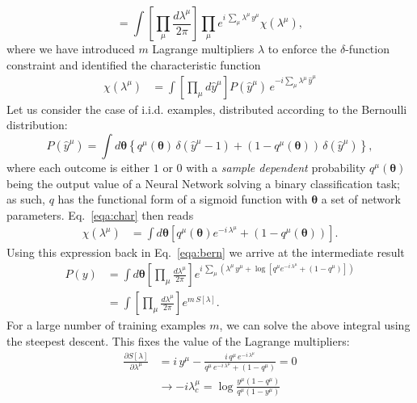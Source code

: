 \documentclass{article}
\begin{document}
 \begin{equation}
 =  \int  \left[ \prod_{\mu}  \frac{d\lambda^{\mu}}{2\pi} \right] \prod_{\mu}  e^{i \, \sum_{\mu} \lambda^{\mu} \, y^{\mu} } \chi(\lambda^{\mu}),
\end{equation}
%
where we have introduced $m$ Lagrange multipliers $\lambda$ to enforce the $\delta$-function constraint and identified  the characteristic function
%
\begin{align} \label{eqa:char}
\chi(\lambda^{\mu}) &=  \int  \left[ \prod_{\mu} d\hat{y}^{\mu} \right]  P(\hat{y}^{\mu} )  \, e^{-i \sum_{\mu} \lambda^{\mu} \, \hat{y}^{\mu}}
\end{align}
%
Let us consider the case of i.i.d. examples, distributed according to the Bernoulli distribution:
%
\begin{equation} \label{eqa:bern}
P(\hat{y}^{\mu} ) = \int d\boldsymbol{\theta} \left\{ q^{\mu}(\boldsymbol{\theta}) \, \delta(\hat{y}^{\mu}-1 ) + (1-q^{\mu}(\boldsymbol{\theta}) ) \, \delta(\hat{y}^{\mu}) \right\},
\end{equation}
%
where each outcome is either $1$ or $0$ with a {\it sample dependent} probability $q^{\mu}(\boldsymbol{\theta})$ being the output value of a Neural Network solving a binary classification task; as such, $q$ has the functional form of a sigmoid function with $\boldsymbol{\theta}$ a set of network parameters. Eq.~\eqref{eqa:char} then reads
\begin{align} \label{eqa:char}
 \chi(\lambda^{\mu}) &=  \int  d\boldsymbol{\theta} \left[ q^{\mu}(\boldsymbol{\theta} ) e^{-i \, \lambda^{\mu} } +(1-q^{\mu}(\boldsymbol{\theta} )) \right].
 \end{align}
%
Using this expression back in Eq.~\eqref{eqa:bern} we arrive at the intermediate result
%
 \begin{align} \label{eqa:cl2} \nonumber
 P(y) &= \int d\boldsymbol{\theta} \left[ \prod_{\mu}  \frac{d\lambda^{\mu}}{2\pi} \right] e^{i \, \sum_{\mu} ( \lambda^{\mu} \, y^{\mu} + \log \left[ q^{\mu} e^{-i \, \lambda^{\mu} } +(1-q^{\mu}) \right] )}  \\
 &=  \int  \left[ \prod_{\mu}  \frac{d\lambda^{\mu}}{2\pi} \right] e^{m \, S[\lambda]}.
 \end{align}
%
For a large number of training examples $m$, we can solve the above integral using the steepest descent. This fixes the value of the Lagrange multipliers:
%
\begin{align} \label{eqa:cl3}
\frac{\partial S[\lambda]}{\partial \lambda^{\mu}} &= i \, y^{\mu} - \frac{i \, q^{\mu} \, e^{-i \, \lambda^{\mu}}}{q^{\mu} \, e^{-i \, \lambda^{\mu}} + (1-q^{\mu})} = 0 \\ \nonumber
&\rightarrow - i \lambda^{\mu}_{c} =  \log \frac{y^{\mu}(1-q^{\mu}) }{q^{\mu}(1- y^{\mu})}
\end{align}
\end{document}
